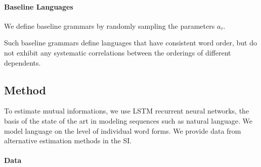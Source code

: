 \documentclass[11pt,letterpaper]{article}
\begin{document}
\paragraph{Baseline Languages}
We define baseline grammars by randomly sampling the parameters $a_\tau$.

Such baseline grammars define languages that have consistent word order, but do not exhibit any systematic correlations between the orderings of different dependents.



\subsection{Method}
%
%
%
%
%
%
%
%
%
%

To estimate mutual informations, we use LSTM recurrent neural networks, the basis of the state of the art in modeling sequences such as natural language.
We model language on the level of individual word forms.
We provide data from alternative estimation methods in the SI.


\paragraph{Data}
\end{document}
